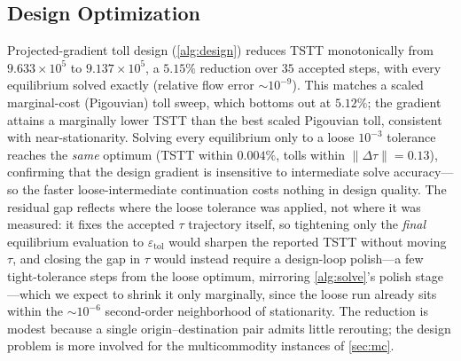 \documentclass[ijoc]{informs3}
\begin{document}
\subsection{Design Optimization}
Projected-gradient toll design (\cref{alg:design}) reduces TSTT monotonically from $9.633\times10^5$ to
$9.137\times10^5$, a $5.15\%$ reduction over $35$ accepted steps, with every equilibrium solved exactly
(relative flow error $\sim10^{-9}$). This matches a scaled marginal-cost (Pigouvian) toll sweep, which bottoms out at $5.12\%$; the gradient
attains a marginally lower TSTT than the best scaled Pigouvian toll, consistent with near-stationarity. Solving every equilibrium only to a loose $10^{-3}$ tolerance reaches the \emph{same} optimum (TSTT within
$0.004\%$, tolls within $\|\Delta\tau\|=0.13$), confirming that the design gradient is insensitive to
intermediate solve accuracy---so the faster loose-intermediate continuation costs nothing in design
quality. The residual gap reflects where the loose tolerance was applied, not where it was measured: it fixes
the accepted $\tau$ trajectory itself, so tightening only the \emph{final} equilibrium evaluation to
$\varepsilon_{\mathrm{tol}}$ would sharpen the reported TSTT without moving $\tau$, and closing the gap in $\tau$
would instead require a design-loop polish---a few tight-tolerance steps from the loose optimum, mirroring
\cref{alg:solve}'s polish stage---which we expect to shrink it only marginally, since the loose run already sits
within the $\sim10^{-6}$ second-order neighborhood of stationarity. The reduction is modest because a single origin--destination pair admits little rerouting; the design problem is more involved for the
multicommodity instances of \cref{sec:mc}.
\end{document}
